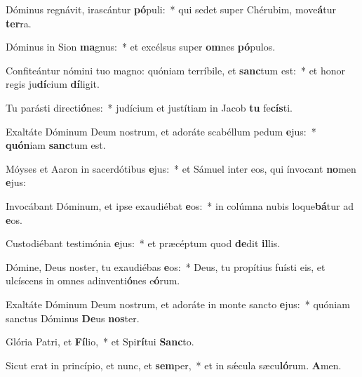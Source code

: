 \item Dóminus regnávit, irascántur \textbf{pó}puli:~* qui sedet super Chérubim, move\textbf{á}tur \textbf{ter}ra.

\item Dóminus in Sion \textbf{ma}gnus:~* et excélsus super \textbf{om}nes \textbf{pó}pulos.

\item Confiteántur nómini tuo magno: quóniam terríbile, et \textbf{sanc}tum est:~* et honor regis ju\textbf{dí}cium \textbf{dí}ligit.

\item Tu parásti directi\textbf{ó}nes:~* judícium et justítiam in Jacob \textbf{tu} fe\textbf{cís}ti.

\item Exaltáte Dóminum Deum nostrum, et adoráte scabéllum pedum \textbf{e}jus:~* \textbf{quón}iam \textbf{sanc}tum est.

\item Móyses et Aaron in sacerdótibus \textbf{e}jus:~* et Sámuel inter eos, qui ínvocant \textbf{no}men \textbf{e}jus:

\item Invocábant Dóminum, et ipse exaudiébat \textbf{e}os:~* in colúmna nubis loque\textbf{bá}tur ad \textbf{e}os.

\item Custodiébant testimónia \textbf{e}jus:~* et præcéptum quod \textbf{de}dit \textbf{il}lis.

\item Dómine, Deus noster, tu exaudiébas \textbf{e}os:~* Deus, tu propítius fuísti eis, et ulcíscens in omnes adinventi\textbf{ó}nes e\textbf{ó}rum.

\item Exaltáte Dóminum Deum nostrum, et adoráte in monte sancto \textbf{e}jus:~* quóniam sanctus Dóminus \textbf{De}us \textbf{nos}ter.

\item Glória Patri, et \textbf{Fí}lio,~* et Spi\textbf{rí}tui \textbf{Sanc}to.

\item Sicut erat in princípio, et nunc, et \textbf{sem}per,~* et in sǽcula sæcu\textbf{ló}rum. \textbf{A}men.
